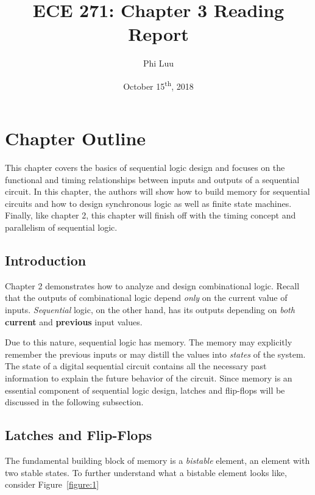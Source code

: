 \documentclass[12pt]{article}
\title{ECE 271: Chapter 3 Reading Report}
\author{Phi Luu}
\date{October 15\textsuperscript{th}, 2018}
\begin{document}
\maketitle

\section{Chapter Outline}

This chapter covers the basics of sequential logic design and focuses on the functional and timing relationships between inputs and outputs of a sequential circuit. In this chapter, the authors will show how to build memory for sequential circuits and how to design synchronous logic as well as finite state machines. Finally, like chapter 2, this chapter will finish off with the timing concept and parallelism of sequential logic.

\subsection{Introduction}

Chapter 2 demonstrates how to analyze and design combinational logic. Recall that the outputs of combinational logic depend \textit{only} on the current value of inputs. \textit{Sequential} logic, on the other hand, has its outputs depending on \textit{both} \textbf{current} and \textbf{previous} input values.

Due to this nature, sequential logic has memory. The memory may explicitly remember the previous inputs or may distill the values into \textit{states} of the system. The state of a digital sequential circuit contains all the necessary past information to explain the future behavior of the circuit. Since memory is an essential component of sequential logic design, latches and flip-flops will be discussed in the following subsection.

\subsection{Latches and Flip-Flops}

The fundamental building block of memory is a \textit{bistable} element, an element with two stable states. To further understand what a bistable element looks like, consider Figure~\ref{figure:1}
\end{document}
